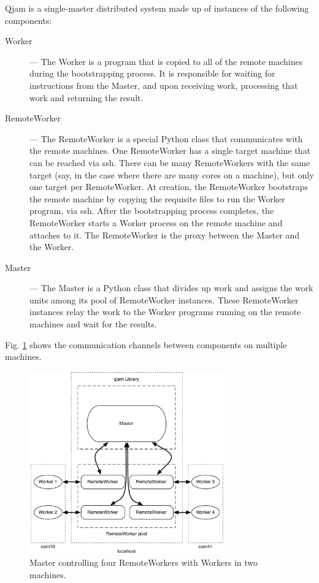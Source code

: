 \documentclass[%
  final,
  notitlepage,
  narroweqnarray,
  inline,
]{ieee}
\begin{document}
Qjam is a single-master distributed system made up of instances of the
following components: \\

\begin{description}
  \item[Worker] --- The Worker is a program that is copied to all of the remote
    machines during the bootstrapping process. It is responsible for waiting
    for instructions from the Master, and upon receiving work, processing that
    work and returning the result. \\

  \item[RemoteWorker] --- The RemoteWorker is a special Python class that
    communicates with the remote machines. One RemoteWorker has a single target
    machine that can be reached via ssh. There can be many RemoteWorkers with
    the same target (say, in the case where there are many cores on a machine),
    but only one target per RemoteWorker. At creation, the RemoteWorker
    bootstraps the remote machine by copying the requisite files to run the
    Worker program, via ssh. After the bootstrapping process completes, the
    RemoteWorker starts a Worker process on the remote machine and attaches to
    it. The RemoteWorker is the proxy between the Master and the Worker. \\

  \item[Master] --- The Master is a Python class that divides up work and
    assigns the work units among its pool of RemoteWorker instances. These
    RemoteWorker instances relay the work to the Worker programs running on the
    remote machines and wait for the results. \\
\end{description}

Fig. \ref{diagram} shows the communication channels between components on
multiple machines.

\begin{figure}[h!]
  \begin{center}
    \includegraphics[width=3.3in]{fwk_diagram/fwk_diagram.pdf}
  \end{center}
  \caption{Master controlling four RemoteWorkers with Workers in two machines.}
  \label{diagram}
\end{figure}
\end{document}
